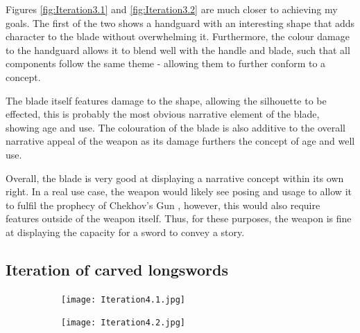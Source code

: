 \documentclass{article}
\begin{document}
Figures \ref{fig:Iteration3.1} and \ref{fig:Iteration3.2} are much closer to achieving my goals. The first of the two shows a handguard with an interesting shape that adds character to the blade without overwhelming it. Furthermore, the colour damage to the handguard allows it to blend well with the handle and blade, such that all components follow the same theme - allowing them to further conform to a concept.

The blade itself features damage to the shape, allowing the silhouette to be effected, this is probably the most obvious narrative element of the blade, showing age and use. The colouration of the blade is also additive to the overall narrative appeal of the weapon as its damage furthers the concept of age and well use.

Overall, the blade is very good at displaying a narrative concept within its own right. In a real use case, the weapon would likely see posing and usage to allow it to fulfil the prophecy of Chekhov's Gun \parencite{delaney1990chekhov}, however, this would also require features outside of the weapon itself. Thus, for these purposes, the weapon is fine at displaying the capacity for a sword to convey a story.

\pagebreak

\subsection{Iteration of carved longswords} \label{Iteration4}

\begin{figure}[h]
    \centering
    \caption{}
    \label{fig:Iteration4}
    \begin{subfigure}{0.49\textwidth}
        \texttt{[image: Iteration4.1.jpg]}
        \caption{}
        \label{fig:Iteration4.1}
    \end{subfigure}
    \begin{subfigure}{0.49\textwidth}
        \texttt{[image: Iteration4.2.jpg]}
        \caption{}
        \label{fig:Iteration4.2}
    \end{subfigure}
\end{figure}
\end{document}
